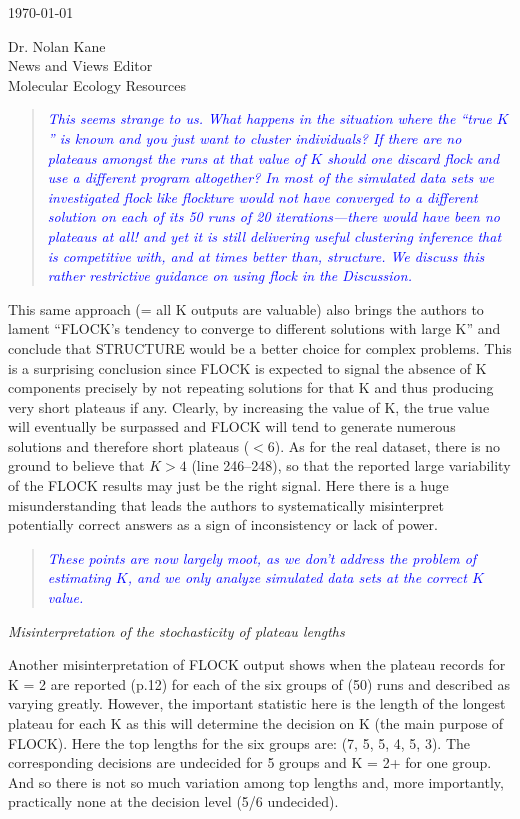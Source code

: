 \documentclass[11pt]{letter}
\newcommand{\reply}[1]{\begin{quotation}\small\sl\textcolor{blue}{#1}\end{quotation}}
\begin{document}
\begin{letter}{ \today 

Dr. Nolan Kane\\
News and Views Editor\\
Molecular Ecology Resources \\
}
\reply{This seems strange to us.  What happens in the situation where the
``true $K$'' is known and you just want to cluster individuals? If there are no plateaus
amongst the runs at that value of $K$ should one discard {\sc flock} and use
a different program altogether? In most of the simulated data sets we investigated {\sc flock}
like {\sc flockture}
would not have converged to a different solution on each of its 50 runs of 20 iterations---there
would have been no plateaus at all!  and yet it is still delivering useful clustering
inference that is competitive with, and at times better than, {\sc structure}.  We discuss
this rather restrictive guidance on using {\sc flock} in the Discussion.  }

This same approach (= all K outputs are valuable) also brings the authors to lament ``FLOCK's tendency to converge to different solutions with large K'' and conclude that STRUCTURE would be a better choice for complex problems. This is a surprising conclusion since FLOCK is expected to signal the absence of K components precisely by not repeating solutions for that K and thus producing very short plateaus if any. Clearly, by increasing the value of K, the true value will eventually be surpassed and FLOCK will tend to generate numerous solutions and therefore short plateaus ($< 6$). As for the real dataset, there is no ground to believe that $K > 4$ (line 246--248), so that the reported large variability of the FLOCK results may just be the right signal. Here there is a huge misunderstanding that leads the authors to systematically misinterpret potentially correct answers as a sign of inconsistency or lack of power.

\reply{These points are now largely moot, as we don't address the problem of estimating $K$, and we
only analyze simulated data sets at the correct $K$ value.}

{\em Misinterpretation of the stochasticity of plateau lengths}

Another misinterpretation of FLOCK output shows when the plateau records for K = 2 are reported (p.12) for each of the six groups of (50) runs and described as varying greatly. However, the important statistic here is the length of the longest plateau for each K as this will determine the decision on K (the main purpose of FLOCK). Here the top lengths for the six groups are: (7, 5, 5, 4, 5, 3). The corresponding decisions are undecided for 5 groups and K = 2+ for one group. And so there is not so much variation among top lengths and, more importantly, practically none at the decision level (5/6 undecided).


\end{letter}
\end{document}
